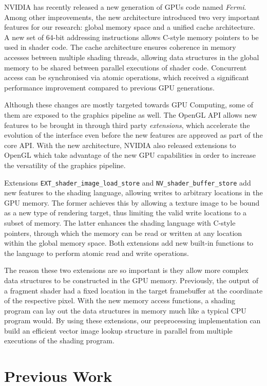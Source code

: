 \documentclass[11pt,a4paper,twoside]{article}
\begin{document}
NVIDIA has recently released a new generation of GPUs code named \emph{Fermi}. Among other improvements, the new architecture introduced two very important features for our research: global memory space and a unified cache architecture. A new set of 64-bit addressing instructions allows C-style memory pointers to be used in shader code. The cache architecture ensures coherence in memory accesses between multiple shading threads, allowing data structures in the global memory to be shared between parallel executions of shader code. Concurrent access can be synchronised via atomic operations, which received a significant performance improvement compared to previous GPU generations.

Although these changes are mostly targeted towards GPU Computing, some of them are exposed to the graphics pipeline as well. The OpenGL API allows new features to be brought in through third party \emph{extensions}, which accelerate the evolution of the interface even before the new features are approved as part of the core API. With the new architecture, NVIDIA also released extensions to OpenGL which take advantage of the new GPU capabilities in order to increase the versatility of the graphics pipeline.

Extensions {\tt EXT\_shader\_image\_load\_store} and {\tt NV\_shader\_buffer\_store} add new features to the shading language, allowing writes to arbitrary locations in the GPU memory. The former achieves this by allowing a texture image to be bound as a new type of rendering target, thus limiting the valid write locations to a subset of memory. The latter enhances the shading language with C-style pointers, through which the memory can be read or written at any location within the global memory space. Both extensions add new built-in functions to the language to perform atomic read and write operations.

The reason these two extensions are so important is they allow more complex data structures to be constructed in the GPU memory. Previously, the output of a fragment shader had a fixed location in the target framebuffer at the coordinate of the respective pixel. With the new memory access functions, a shading program can lay out the data structures in memory much like a typical CPU program would. By using these extensions, our preprocessing implementation can build an efficient vector image lookup structure in parallel from multiple executions of the shading program.

\section {Previous Work}
\end{document}
